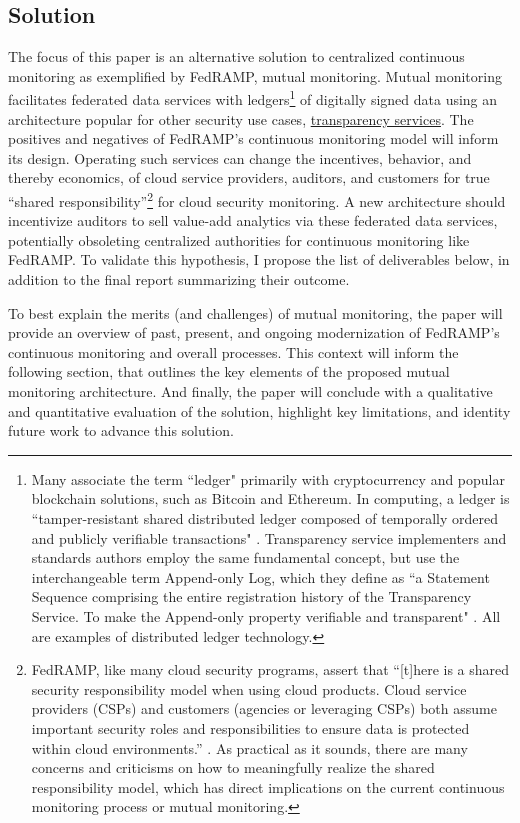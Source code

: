 \documentclass{jdf}
\begin{document}
\subsection{Solution}

The focus of this paper is an alternative solution to centralized continuous monitoring as exemplified by FedRAMP, mutual monitoring. Mutual monitoring facilitates federated data services with ledgers\footnote{Many associate the term ``ledger" primarily with cryptocurrency and popular blockchain solutions, such as Bitcoin and Ethereum. In computing, a ledger is ``tamper-resistant shared distributed ledger composed of temporally ordered and publicly verifiable transactions" \cite{bashir22}. Transparency service implementers and standards authors employ the same fundamental concept, but use the interchangeable term Append-only Log, which they define as ``a Statement Sequence comprising the entire registration history of the Transparency Service. To make the Append-only property verifiable and transparent" \cite{scitt25}. All are examples of distributed ledger technology.} of digitally signed data using an architecture popular for other security use cases, \hyperlink{https://transparency.dev}{transparency services}. The positives and negatives of FedRAMP's continuous monitoring model will inform its design. Operating such services can change the incentives, behavior, and thereby economics, of cloud service providers, auditors, and customers for true ``shared responsibility''\footnote{FedRAMP, like many cloud security programs, assert that ``[t]here is a shared security responsibility model when using cloud products. Cloud service providers (CSPs) and customers (agencies or leveraging CSPs) both assume important security roles and responsibilities to ensure data is protected within cloud environments.'' \citeyear{fedramp_srm25}. As practical as it sounds, there are many concerns and criticisms on how to meaningfully realize the shared responsibility model, which has direct implications on the current continuous monitoring process or mutual monitoring.} for cloud security monitoring. A new architecture should incentivize auditors to sell value-add analytics via these federated data services, potentially obsoleting centralized authorities for continuous monitoring like FedRAMP. To validate this hypothesis, I propose the list of deliverables below, in addition to the final report summarizing their outcome. 

To best explain the merits (and challenges) of mutual monitoring, the paper will provide an overview of past, present, and ongoing modernization of FedRAMP's continuous monitoring and overall processes. This context will inform the following section, that outlines the key elements of the proposed mutual monitoring architecture. And finally, the paper will conclude with a qualitative and quantitative evaluation of the solution, highlight key limitations, and identity future work to advance this solution.
\end{document}
